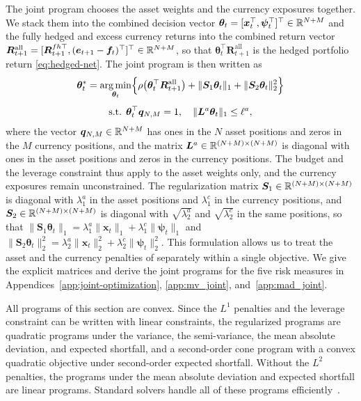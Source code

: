 The joint program chooses the asset weights and the currency exposures together. We stack them into the combined
decision vector $\bm{\theta}_t = [\bm{x}_t^\top, \bm{\psi}_t^\top]^\top \in \mathbb{R}^{N+M}$ and the fully hedged and excess
currency returns into the combined return vector
$\bm{R}^{\text{all}}_{t+1} = [\bm{R}^{fh\top}_{t+1}, (\bm{e}_{t+1} - \bm{f}_t)^\top]^\top \in \mathbb{R}^{N+M}$, so that
$\bm{\theta}_t^\top \bm{R}^{\text{all}}_{t+1}$ is the hedged portfolio return \eqref{eq:hedged-net}. The joint program is then written as
\begin{equation}\label{eq:joint}
\begin{gathered}
    \bm{\theta}_t^* = \operatorname*{arg\,min}_{\bm{\theta}_t} \Bigl\{ \rho\bigl( \bm{\theta}_t^\top \bm{R}^{\text{all}}_{t+1} \bigr)
    + \|\bm{S}_1 \bm{\theta}_t\|_1 + \|\bm{S}_2 \bm{\theta}_t\|_2^2 \Bigr\} \\[4pt]
    \text{s.t. } \bm{\theta}_t^\top \bm{q}_{N,M} = 1, \quad \|\bm{L}^a \bm{\theta}_t\|_1 \le \ell^a,
\end{gathered}
\end{equation}
where the vector $\bm{q}_{N,M} \in \mathbb{R}^{N+M}$ has ones in the $N$ asset positions and zeros in the $M$ currency
positions, and the matrix $\bm{L}^a \in \mathbb{R}^{(N+M) \times (N+M)}$ is diagonal with ones in the asset positions and zeros
in the currency positions. The budget and the leverage constraint thus apply to the asset weights only, and the currency exposures remain unconstrained. The regularization matrix
$\bm{S}_1 \in \mathbb{R}^{(N+M) \times (N+M)}$ is diagonal with $\lambda_1^a$ in the asset positions and $\lambda_1^c$ in the
currency positions, and $\bm{S}_2 \in \mathbb{R}^{(N+M) \times (N+M)}$ is diagonal with $\sqrt{\lambda_2^a}$ and
$\sqrt{\lambda_2^c}$ in the same positions, so that
$\|\bm{S}_1 \bm{\theta}_t\|_1 = \lambda_1^a \|\bm{x}_t\|_1 + \lambda_1^c \|\bm{\psi}_t\|_1$ and
$\|\bm{S}_2 \bm{\theta}_t\|_2^2 = \lambda_2^a \|\bm{x}_t\|_2^2 + \lambda_2^c \|\bm{\psi}_t\|_2^2$. This formulation allows us to treat
the asset and the currency penalties of  separately within a single objective. We give the
explicit matrices and derive the joint programs for the five risk measures in
Appendices~\ref{app:joint-optimization}, \ref{app:mv_joint}, and~\ref{app:mad_joint}.

All programs of this section are convex. Since the $L^1$ penalties and the leverage constraint can be written with
linear constraints, the regularized programs are quadratic programs under the variance, the semi-variance, the mean
absolute deviation, and expected shortfall, and a second-order cone program with a convex quadratic objective under
second-order expected shortfall. Without the $L^2$ penalties, the programs under the mean absolute deviation and expected
shortfall are linear programs. Standard solvers handle all of these programs efficiently~\cite{boyd2004convex}.

